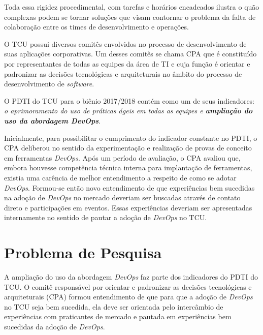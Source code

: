 Toda essa rigidez procedimental, com tarefas e horários encadeados ilustra o
quão complexas podem se tornar soluções que visam contornar o problema da falta
de colaboração entre os times de desenvolvimento e operações.

O \acrshort{TCU} possui diversos comitês envolvidos no processo de desenvolvimento
de suas aplicações corporativas. Um desses comitês se chama \acrfull{CPA} que é
constituído por representantes de todas as equipes da área de \acrshort{TI} e cuja
função é orientar e padronizar as decisões tecnológicas e arquiteturais no
âmbito do processo de desenvolvimento de \textit{software}.

O \acrfull{PDTI} do \acrshort{TCU} para o biênio 2017/2018 contém como um de seus
indicadores: \emph{o aprimoramento do uso de práticas ágeis em todas as equipes
e \textbf{ampliação do uso da abordagem DevOps}}.

Inicialmente, para possibilitar o cumprimento do indicador constante no
\acrshort{PDTI}, o \acrshort{CPA} deliberou no sentido da experimentação e
realização de provas de conceito em ferramentas \textit{DevOps}. Após um
período de avaliação, o \acrshort{CPA} avaliou que, embora
houvesse competência técnica interna para implantação de ferramentas, existia
uma carência de melhor entendimento a respeito de como se adotar \textit{DevOps}.
Formou-se então novo entendimento de que experiências bem sucedidas na adoção de
\textit{DevOps} no mercado deveriam ser buscadas através de contato direto
e participações em eventos. Essas experiências deveriam ser apresentadas
internamente no sentido de pautar a adoção de \textit{DevOps} no \acrshort{TCU}.

\section{Problema de Pesquisa}%

A ampliação do uso da abordagem \textit{DevOps} faz parte dos indicadores
do \acrshort{PDTI} do \acrshort{TCU}. O comitê responsável por orientar e
padronizar as decisões tecnológicas e arquiteturais (\acrshort{CPA}) formou
entendimento de que para que a adoção de \textit{DevOps} no \acrshort{TCU}
seja bem sucedida, ela deve ser orientada pelo intercâmbio de experiências com
praticantes de mercado e pautada em experiências bem sucedidas da adoção de
\textit{DevOps}.

